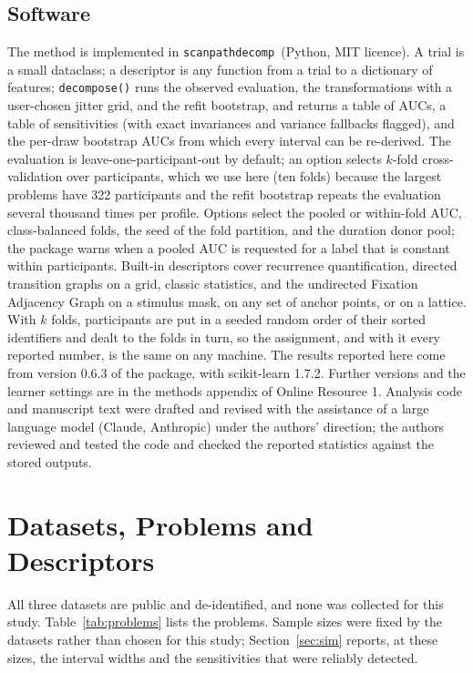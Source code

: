 \documentclass[11pt]{article}
\newcommand{\pkg}{\texttt{scanpathdecomp}}
\begin{document}
\subsection{Software}
The method is implemented in \pkg\ (Python, MIT licence). A trial is a small dataclass; a descriptor is any function from a trial to a dictionary of features; \texttt{decompose()} runs the observed evaluation, the transformations with a user-chosen jitter grid, and the refit bootstrap, and returns a table of AUCs, a table of sensitivities (with exact invariances and variance fallbacks flagged), and the per-draw bootstrap AUCs from which every interval can be re-derived. The evaluation is leave-one-participant-out by default; an option selects $k$-fold cross-validation over participants, which we use here (ten folds) because the largest problems have 322 participants and the refit bootstrap repeats the evaluation several thousand times per profile. Options select the pooled or within-fold AUC, class-balanced folds, the seed of the fold partition, and the duration donor pool; the package warns when a pooled AUC is requested for a label that is constant within participants. Built-in descriptors cover recurrence quantification, directed transition graphs on a grid, classic statistics, and the undirected Fixation Adjacency Graph on a stimulus mask, on any set of anchor points, or on a lattice. With $k$ folds, participants are put in a seeded random order of their sorted identifiers and dealt to the folds in turn, so the assignment, and with it every reported number, is the same on any machine. The results reported here come from version 0.6.3 of the package, with scikit-learn 1.7.2. Further versions and the learner settings are in the methods appendix of Online Resource 1. Analysis code and manuscript text were drafted and revised with the assistance of a large language model (Claude, Anthropic) under the authors' direction; the authors reviewed and tested the code and checked the reported statistics against the stored outputs.



\section{Datasets, Problems and Descriptors}\label{sec:data}
All three datasets are public and de-identified, and none was collected for this study. Table~\ref{tab:problems} lists the problems. Sample sizes were fixed by the datasets rather than chosen for this study; Section~\ref{sec:sim} reports, at these sizes, the interval widths and the sensitivities that were reliably detected.
\end{document}
